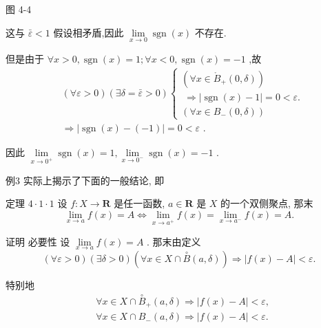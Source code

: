 图 4-4

这与 $\bar{\varepsilon } < 1$ 假设相矛盾,因此 $\mathop{\lim }\limits_{{x \rightarrow  0}}\operatorname{sgn}\left( x\right)$ 不存在.

但是由于 $\forall x > 0,\operatorname{sgn}\left( x\right)  = 1;\forall x < 0,\operatorname{sgn}\left( x\right)  =  - 1$ ,故
\begin{align*}
	&\left( {\forall \varepsilon  > 0}\right) \left( {\exists \delta  = \bar{\varepsilon } > 0}\right) \left\{  \begin{array}{l} \left( {\forall x \in  {\mathring{B}}_{ + }\left( {0,\delta }\right) }\right) \\  \; \Rightarrow  \left| {\operatorname{sgn}\left( x\right)  - 1}\right|  = 0 < \varepsilon . \\  \left( {\forall x \in  {B}_{ - }\left( {0,\delta }\right) }\right)  \end{array}\right.\\
	&\Rightarrow  \left| {\operatorname{sgn}\left( x\right)  - \left( {-1}\right) }\right|  = 0 < \varepsilon \text{ . }
\end{align*}

因此 $\mathop{\lim }\limits_{{x \rightarrow  {0}^{ + }}}\operatorname{sgn}\left( x\right)  = 1,\mathop{\lim }\limits_{{x \rightarrow  {0}^{ - }}}\operatorname{sgn}\left( x\right)  =  - 1$ .

例3 实际上揭示了下面的一般结论, 即

定理 $4 \cdot  1 \cdot  1$ 设 $f : X \rightarrow  \mathbf{R}$ 是任一函数, $a \in  \mathbf{R}$ 是 $X$ 的一个双侧聚点, 那末
$$\mathop{\lim }\limits_{{x \rightarrow  a}}f\left( x\right)  = A \Leftrightarrow  \mathop{\lim }\limits_{{x \rightarrow  {a}^{ + }}}f\left( x\right)  = \mathop{\lim }\limits_{{x \rightarrow  {a}^{ - }}}f\left( x\right)  = A.$$

证明 必要性 设 $\mathop{\lim }\limits_{{x \rightarrow  a}}f\left( x\right)  = A$ . 那末由定义
$$\left( {\forall \varepsilon  > 0}\right) \left( {\exists \delta  > 0}\right) \left( {\forall x \in  X \cap  \overset{ \circ  }{B}\left( {a,\delta }\right) }\right)  \Rightarrow  \left| {f\left( x\right)  - A}\right|  < \varepsilon .$$

特别地
\begin{align*}
	&\forall x \in  X \cap  {\overset{ \circ  }{B}}_{ + }\left( {a,\delta }\right)  \Rightarrow  \left| {f\left( x\right)  - A}\right|  < \varepsilon ,\\
	&\forall x \in  X \cap  {B}_{ - }\left( {a,\delta }\right)  \Rightarrow  \left| {f\left( x\right)  - A}\right|  < \varepsilon .
\end{align*}

